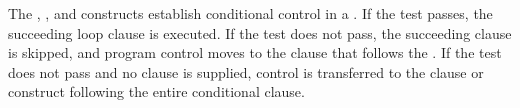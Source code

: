 \endsubsection%


% 
% 

The , , and  constructs
establish conditional control in a . If the test
passes, the succeeding loop clause is executed. If the test does
not pass, the succeeding clause is skipped, and program control
moves to the clause that follows the 
. If the test does not pass and no 
clause is supplied, control is transferred to the clause or
construct following the entire conditional clause.

